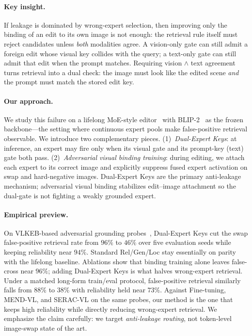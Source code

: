 \documentclass[letterpaper]{article} %
\begin{document}
\paragraph{Key insight.}
If leakage is dominated by wrong-expert selection, then improving only the binding of an edit to its own image is not enough: the retrieval rule itself must reject candidates unless \emph{both} modalities agree.
A vision-only gate can still admit a foreign edit whose visual key collides with the query; a text-only gate can still admit that edit when the prompt matches.
Requiring vision $\wedge$ text agreement turns retrieval into a dual check: the image must look like the edited scene \emph{and} the prompt must match the stored edit key.

\paragraph{Our approach.}
We study this failure on a lifelong MoE-style editor~\citep{chen2025liveedit} with BLIP-2~\citep{li2023blip2} as the frozen backbone---the setting where continuous expert pools make false-positive retrieval observable.
We introduce two complementary pieces.
(1)~\emph{Dual-Expert Keys}: at inference, an expert may fire only when its visual gate and its prompt-key (text) gate both pass.
(2)~\emph{Adversarial visual binding training}: during editing, we attach each expert to its correct image and explicitly suppress fused expert activation on swap and hard-negative images.
Dual-Expert Keys are the primary anti-leakage mechanism; adversarial visual binding stabilizes edit--image attachment so the dual-gate is not fighting a weakly grounded expert.

\paragraph{Empirical preview.}
On VLKEB-based adversarial grounding probes~\citep{huang2024vlkeb}, Dual-Expert Keys cut the swap false-positive retrieval rate from $96\%$ to $46\%$ over five evaluation seeds while keeping reliability near $94\%$.
Standard Rel/Gen/Loc stay essentially on parity with the lifelong baseline.
Ablations show that binding training alone leaves false-cross near $96\%$; adding Dual-Expert Keys is what halves wrong-expert retrieval.
Under a matched long-form train/eval protocol, false-positive retrieval similarly falls from $88\%$ to $38\%$ with reliability held near $73\%$.
Against Fine-tuning, MEND-VL, and SERAC-VL on the same probes, our method is the one that keeps high reliability while directly reducing wrong-expert retrieval.
We emphasize the claim carefully: we target \emph{anti-leakage routing}, not token-level image-swap state of the art.
\end{document}
